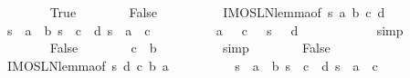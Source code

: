 \begin{isabellebody}
\ \ \ \ \ \ \isamarkupfalse%
\ True\isanewline
\ \ \ \ \ \ \isamarkupfalse%
\ False\isanewline
\ \ \ \ \ \ \ \ \isamarkupfalse%
\ IMO{}{}{}{}SL{\isacharunderscore}N{}{\isacharunderscore}lemma{\isacharbrackleft}of\ {\isachardoublequoteopen}{\isacharquery}s{\isachardoublequoteclose}\ a\ {\isacharquery}b\ c\ {\isacharquery}d{\isacharbrackright}\isanewline
\ \ \ \ \ \ \ \ \isamarkupfalse%
\ {\isacharbackquoteopen}{\isacharquery}s{\isacharcircum}{}\ {\isacharequal}\ a{\isacharcircum}{}\ {\isacharplus}\ {\isacharquery}b{\isacharcircum}{}{\isacharbackquoteclose}\ {\isacharbackquoteopen}{\isacharquery}s{\isacharcircum}{}\ {\isacharequal}\ c{\isacharcircum}{}\ {\isacharplus}\ {\isacharquery}d{\isacharcircum}{}{\isacharbackquoteclose}\ {\isacharbackquoteopen}{}{\isacharasterisk}{\isacharquery}s\ {\isacharequal}\ a{\isacharcircum}{}\ {\isacharminus}\ c{\isacharcircum}{}{\isacharbackquoteclose}\isanewline
\ \ \ \ \ \ \ \ \isamarkupfalse%
\ {\isacharbackquoteopen}a\ {\isachargreater}\ {}{\isacharbackquoteclose}\ {\isacharbackquoteopen}c\ {\isachargreater}\ {}{\isacharbackquoteclose}\ {\isacharbackquoteopen}{\isacharquery}s\ {\isachargreater}\ {}{\isacharbackquoteclose}\ {\isacharbackquoteopen}{\isacharquery}d\ {\isasymge}\ {}{\isacharbackquoteclose}\isanewline
\ \ \ \ \ \ \ \ \isamarkupfalse%
\ simp\isanewline
\ \ \ \ \isamarkupfalse%
\isanewline
\ \ \ \ \ \ \isamarkupfalse%
\ False\isanewline
\ \ \ \ \ \ \isamarkupfalse%
\ {\isachardoublequoteopen}c\ {\isasymge}\ {\isacharquery}b{\isachardoublequoteclose}\isanewline
\ \ \ \ \ \ \ \ \isamarkupfalse%
\ simp\isanewline
\ \ \ \ \ \ \isamarkupfalse%
\ False\isanewline
\ \ \ \ \ \ \ \ \isamarkupfalse%
\ IMO{}{}{}{}SL{\isacharunderscore}N{}{\isacharunderscore}lemma{\isacharbrackleft}of\ {\isachardoublequoteopen}{\isacharquery}s{\isachardoublequoteclose}\ {\isacharquery}d\ c\ {\isacharquery}b\ a{\isacharbrackright}\isanewline
\ \ \ \ \ \ \ \ \isamarkupfalse%
\ {\isacharbackquoteopen}{\isacharquery}s{\isacharcircum}{}\ {\isacharequal}\ a{\isacharcircum}{}\ {\isacharplus}\ {\isacharquery}b{\isacharcircum}{}{\isacharbackquoteclose}\ {\isacharbackquoteopen}{\isacharquery}s{\isacharcircum}{}\ {\isacharequal}\ c{\isacharcircum}{}\ {\isacharplus}\ {\isacharquery}d{\isacharcircum}{}{\isacharbackquoteclose}\ {\isacharbackquoteopen}{}{\isacharasterisk}{\isacharquery}s\ {\isacharequal}\ a{\isacharcircum}{}\ {\isacharminus}\ c{\isacharcircum}{}{\isacharbackquoteclose}\isanewline

\end{isabellebody}
